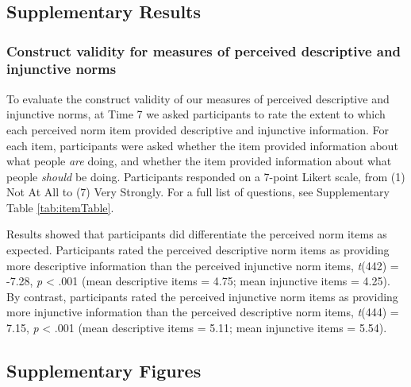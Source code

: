 \documentclass[
  man, donotrepeattitle,floatsintext]{apa6}
\begin{document}
\hypertarget{section}{%
\section{}\label{section}}

\hypertarget{supplementary-results}{%
\subsection{Supplementary Results}\label{supplementary-results}}

\hypertarget{construct-validity-for-measures-of-perceived-descriptive-and-injunctive-norms}{%
\subsubsection{Construct validity for measures of perceived descriptive and injunctive norms}\label{construct-validity-for-measures-of-perceived-descriptive-and-injunctive-norms}}

To evaluate the construct validity of our measures of perceived descriptive and injunctive norms, at Time 7 we asked participants to rate the extent to which each perceived norm item provided descriptive and injunctive information. For each item, participants were asked whether the item provided information about what people \emph{are} doing, and whether the item provided information about what people \emph{should} be doing. Participants responded on a 7-point Likert scale, from (1) Not At All to (7) Very Strongly. For a full list of questions, see Supplementary Table \ref{tab:itemTable}.

Results showed that participants did differentiate the perceived norm items as expected. Participants rated the perceived descriptive norm items as providing more descriptive information than the perceived injunctive norm items, \emph{t}(442) = -7.28, \emph{p} \textless{} .001 (mean descriptive items = 4.75; mean injunctive items = 4.25). By contrast, participants rated the perceived injunctive norm items as providing more injunctive information than the perceived descriptive norm items, \emph{t}(444) = 7.15, \emph{p} \textless{} .001 (mean descriptive items = 5.11; mean injunctive items = 5.54).

\newpage

\hypertarget{supplementary-figures}{%
\subsection{Supplementary Figures}\label{supplementary-figures}}
\end{document}
